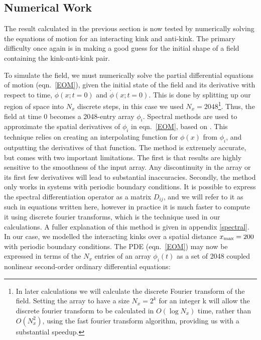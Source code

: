 \documentclass[11pt, oneside]{article}  	%
\numberwithin{equation}{section}
\begin{document}
\subsection{Numerical Work} \label{kink_kink_comp}
The result calculated in the previous section is now tested by numerically solving the equations of motion for an interacting kink and anti-kink. The primary difficulty once again is in making a good guess for the initial shape of a field containing the kink-anti-kink pair.\par
To simulate the field, we must numerically solve the partial differential equations of motion (eqn.~\ref{EOM}), given the initial state of the field and its derivative with respect to time, $\phi(x;t=0)$ and $\dot{\phi}(x;t=0)$. This is done by splitting up our region of space into $N_x$ discrete steps, in this case we used $N_x = 2048$\footnote{In later calculations we will calculate the discrete Fourier transform of the field. Setting the array to have a size $N_x = 2^k$ for an integer k will allow the discrete fourier transform to be calculated in $O(\log N_x)$ time, rather than $O(N_x^2)$, using the fast fourier transform algorithm, providing us with a substantial speedup.}. Thus, the field at time 0 becomes a 2048-entry array $\phi_i$. Spectral methods are used to approximate the spatial derivatives of $\phi_i$ in eqn.~\ref{EOM}, based on \cite{spectral}. This technique relies on creating an interpolating function for $\phi(x)$ from $\phi_i$, and outputting the derivatives of that function. The method is extremely accurate, but comes with two important limitations. The first is that results are highly sensitive to the smoothness of the input array. Any discontinuity in the array or its first few derivatives will lead to substantial inaccuracies. Secondly, the method only works in systems with periodic boundary conditions. It is possible to express the spectral differentiation operator as a matrix $D_{ij}$, and we will refer to it as such in equations written here, however in practice it is much faster to compute it using discrete fourier transforms, which is the technique used in our calculations. A fuller explanation of this method is given in appendix \ref{spectral}. In our case, we modelled the interacting kinks over a spatial distance $x_\textup{max} = 200$ with periodic boundary conditions. The PDE (eqn.~\ref{EOM}) may now be expressed in terms of the $N_x$ entries of an array $\phi_i(t)$ as a set of 2048 coupled nonlinear second-order ordinary differential equations:
\end{document}
